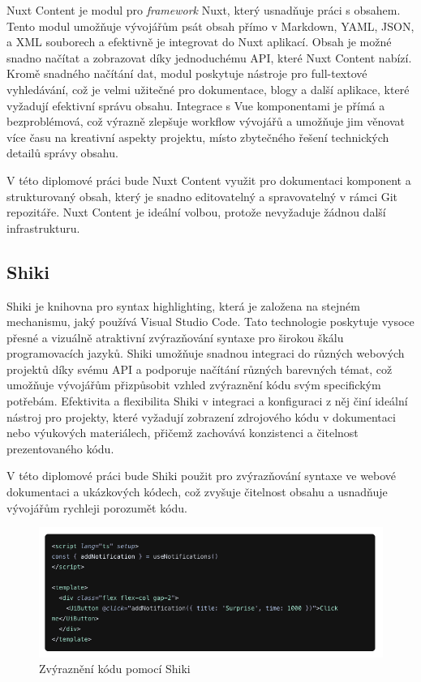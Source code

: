Nuxt Content je modul pro \emph{framework} Nuxt, který usnadňuje práci s obsahem. Tento modul umožňuje vývojářům psát obsah přímo v Markdown, YAML, JSON, a XML souborech a efektivně je integrovat do Nuxt aplikací. Obsah je možné snadno načítat a zobrazovat díky jednoduchému API, které Nuxt Content nabízí. Kromě snadného načítání dat, modul poskytuje nástroje pro full-textové vyhledávání, což je velmi užitečné pro dokumentace, blogy a další aplikace, které vyžadují efektivní správu obsahu. Integrace s Vue komponentami je přímá a bezproblémová, což výrazně zlepšuje workflow vývojářů a umožňuje jim věnovat více času na kreativní aspekty projektu, místo zbytečného řešení technických detailů správy obsahu.

V této diplomové práci bude Nuxt Content využit pro dokumentaci komponent a strukturovaný obsah, který je snadno editovatelný a spravovatelný v rámci Git repozitáře. Nuxt Content je ideální volbou, protože nevyžaduje žádnou další infrastrukturu.

\subsection{Shiki}
Shiki je knihovna pro syntax highlighting, která je založena na stejném mechanismu, jaký používá Visual Studio Code. Tato technologie poskytuje vysoce přesné a vizuálně atraktivní zvýrazňování syntaxe pro širokou škálu programovacích jazyků. Shiki umožňuje snadnou integraci do různých webových projektů díky svému API a podporuje načítání různých barevných témat, což umožňuje vývojářům přizpůsobit vzhled zvýraznění kódu svým specifickým potřebám. Efektivita a flexibilita Shiki v integraci a konfiguraci z něj činí ideální nástroj pro projekty, které vyžadují zobrazení zdrojového kódu v dokumentaci nebo výukových materiálech, přičemž zachovává konzistenci a čitelnost prezentovaného kódu. \cite{Shiki}

V této diplomové práci bude Shiki použit pro zvýrazňování syntaxe ve webové dokumentaci a ukázkových kódech, což zvyšuje čitelnost obsahu a usnadňuje vývojářům rychleji porozumět kódu.

\begin{figure}[H]
  \includegraphics[width=\textwidth]{images/shiki}
  \caption{Zvýraznění kódu pomocí Shiki} \label{picture:shiki}
\end{figure}

